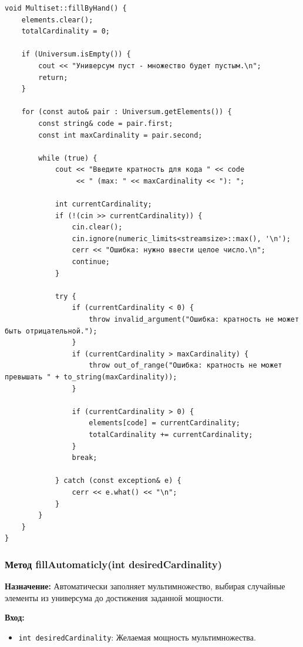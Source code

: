 \begin{lstlisting}[style=cstyle, caption={Реализация fillByHand()}]
void Multiset::fillByHand() {
    elements.clear();
    totalCardinality = 0;

    if (Universum.isEmpty()) {
        cout << "Универсум пуст - множество будет пустым.\n";
        return;
    }

    for (const auto& pair : Universum.getElements()) {
        const string& code = pair.first;
        const int maxCardinality = pair.second;

        while (true) {
            cout << "Введите кратность для кода " << code
                 << " (max: " << maxCardinality << "): ";

            int currentCardinality;
            if (!(cin >> currentCardinality)) {
                cin.clear();
                cin.ignore(numeric_limits<streamsize>::max(), '\n');
                cerr << "Ошибка: нужно ввести целое число.\n";
                continue;
            }

            try {
                if (currentCardinality < 0) {
                    throw invalid_argument("Ошибка: кратность не может быть отрицательной.");
                }
                if (currentCardinality > maxCardinality) {
                    throw out_of_range("Ошибка: кратность не может превышать " + to_string(maxCardinality));
                }

                if (currentCardinality > 0) {
                    elements[code] = currentCardinality;
                    totalCardinality += currentCardinality;
                }
                break;

            } catch (const exception& e) {
                cerr << e.what() << "\n";
            }
        }
    }
}
\end{lstlisting}

\subsubsection{Метод fillAutomaticly(int desiredCardinality)}

\textbf{Назначение:} Автоматически заполняет мультимножество, выбирая случайные элементы из универсума до достижения заданной мощности.

\textbf{Вход:}
\begin{itemize}
    \item \texttt{int desiredCardinality}: Желаемая мощность мультимножества.
\end{itemize}

